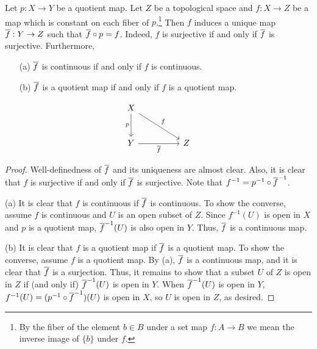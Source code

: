 \begin{thm}
    Let $p: X\rightarrow Y$ be a quotient map.
    Let $Z$ be a topological space and $f: X\rightarrow Z$ be a map which is constant on each fiber of $p$.\footnote{By the fiber of the element $b\in B$ under a set map $f: A\rightarrow B$ we mean the inverse image of $\{b\}$ under $f$.}
    Then $f$ induces a unique map $\overline{f}: Y\rightarrow Z$ such that $\overline{f}\circ p=f$.
    Indeed, $f$ is surjective if and only if $\overline{f}$ is surjective.
    Furthermore,
    \begin{enumerate}
        \item[(a)]
        {
            $\overline{f}$ is continuous if and only if $f$ is continuous.
        }
        \item[(b)]
        {
            $\overline{f}$ is a quotient map if and only if $f$ is a quotient map.
        }
    \end{enumerate}
    \begin{equation*}
    \begin{tikzcd}[row sep=large, column sep=huge]
        X
        \arrow[d, "p"']
        \arrow[dr, "f"]
        &\\
        Y\arrow[r, "\ol{f}"']
        &
        Z
    \end{tikzcd}
    \end{equation*}
\end{thm}
\begin{proof}
    Well-definedness of $\overline{f}$ and its uniqueness are almost clear.
    Also, it is clear that $f$ is surjective if and only if $\overline{f}$ is surjective.
    Note that $f^{-1}=p^{-1}\circ\overline{f}^{-1}$.

    \hangindent=0.65cm
    \noindent(a)
    It is clear that $f$ is continuous if $\overline{f}$ is continuous.
    To show the converse, assume $f$ is continuous and $U$ is an open subset of $Z$.
    Since $f^{-1}(U)$ is open in $X$ and $p$ is a quotient map, $\overline{f}^{-1}(U)$ is also open in $Y$.
    Thus, $\overline{f}$ is a continuous map.

    \noindent(b)
    It is clear that $f$ is a quotient map if $\overline{f}$ is a quotient map.
    To show the converse, assume $f$ is a quotient map.
    By (a), $\overline{f}$ is a continuous map, and it is clear that $\overline{f}$ is a surjection.
    Thus, it remains to show that a subset $U$ of $Z$ is open in $Z$ if (and only if) $\overline{f}^{-1}(U)$ is open in $Y$.
    When $\overline{f}^{-1}(U)$ is open in $Y$, $f^{-1}(U)=(p^{-1}\circ\overline{f}^{-1})(U)$ is open in $X$, so $U$ is open in $Z$, as desired.
\end{proof}

